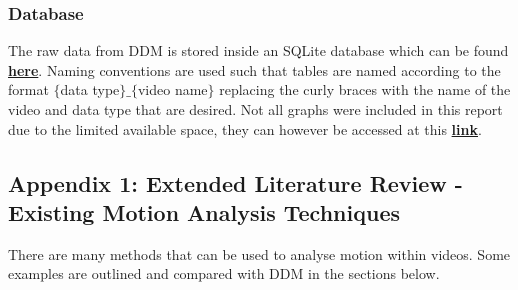 \documentclass[10pt]{article}
\let\oldhref\href
\renewcommand{\href}[2]{\oldhref{#1}{\bfseries#2}}
\begin{document}
\subsubsection{Database}
\label{section:database}
The raw data from DDM is stored inside an SQLite database which can be found \href{https://github.com/jordanosborn/CrowdAnalysisDDM/blob/master/code/crowd.sqlite?raw=true}{here}. Naming conventions are used such that tables are named according to the format $\{$data type$\}\_\{$video name$\}$ replacing the curly braces with the name of the video and data type that are desired. Not all graphs were included in this report due to the limited available space, they can however be accessed at this  \href{https://drive.google.com/drive/folders/1LI3qSCtjwXnbb-hIaWZYloMIHjo4BUsj?usp=sharing}{link}.

\subsection{Appendix 1: Extended Literature Review - Existing Motion Analysis Techniques}
\label{section:existing}
There are many methods that can be used to analyse motion within videos. Some examples are outlined and compared with DDM in the sections below.
\end{document}
